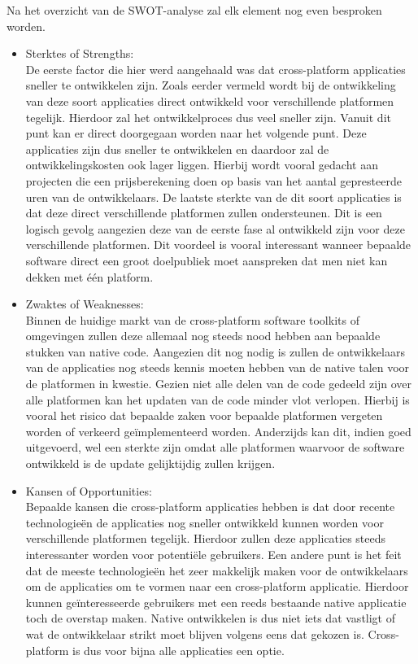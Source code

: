 Na het overzicht van de SWOT-analyse zal elk element nog even besproken worden. 
\begin{itemize}
    \item Sterktes of Strengths:\\
    De eerste factor die hier werd aangehaald was dat cross-platform applicaties sneller te ontwikkelen zijn. Zoals eerder vermeld wordt bij de ontwikkeling van deze soort applicaties direct ontwikkeld voor verschillende platformen tegelijk. Hierdoor zal het ontwikkelproces dus veel sneller zijn. Vanuit dit punt kan er direct doorgegaan worden naar het volgende punt. Deze applicaties zijn dus sneller te ontwikkelen en daardoor zal de ontwikkelingskosten ook lager liggen. Hierbij wordt vooral gedacht aan projecten die een prijsberekening doen op basis van het aantal gepresteerde uren van de ontwikkelaars. De laatste sterkte van de dit soort applicaties is dat deze direct verschillende platformen zullen ondersteunen. Dit is een logisch gevolg aangezien deze van de eerste fase al ontwikkeld zijn voor deze verschillende platformen. Dit voordeel is vooral interessant wanneer bepaalde software direct een groot doelpubliek moet aanspreken dat men niet kan dekken met één platform.
    \\
    
    \item Zwaktes of Weaknesses:\\
    Binnen de huidige markt van de cross-platform software toolkits of omgevingen zullen deze allemaal nog steeds nood hebben aan bepaalde stukken van native code. Aangezien dit nog nodig is zullen de ontwikkelaars van de applicaties nog steeds kennis moeten hebben van de native talen voor de platformen in kwestie. Gezien niet alle delen van de code gedeeld zijn over alle platformen kan het updaten van de code minder vlot verlopen. Hierbij is vooral het risico dat bepaalde zaken voor bepaalde platformen vergeten worden of verkeerd geïmplementeerd worden. Anderzijds kan dit, indien goed uitgevoerd, wel een sterkte zijn omdat alle platformen waarvoor de software ontwikkeld is de update gelijktijdig zullen krijgen.
    \\
    
    \item Kansen of Opportunities:\\
    Bepaalde kansen die cross-platform applicaties hebben is dat door recente technologieën de applicaties nog sneller ontwikkeld kunnen worden voor verschillende platformen tegelijk. Hierdoor zullen deze applicaties steeds interessanter worden voor potentiële gebruikers. Een andere punt is het feit dat de meeste technologieën het zeer makkelijk maken voor de ontwikkelaars om de applicaties om te vormen naar een cross-platform applicatie. Hierdoor kunnen geïnteresseerde gebruikers met een reeds bestaande native applicatie toch de overstap maken. Native ontwikkelen is dus niet iets dat vastligt of wat de ontwikkelaar strikt moet blijven volgens eens dat gekozen is. Cross-platform is dus voor bijna alle applicaties een optie. 
    \\
    

\end{itemize}
